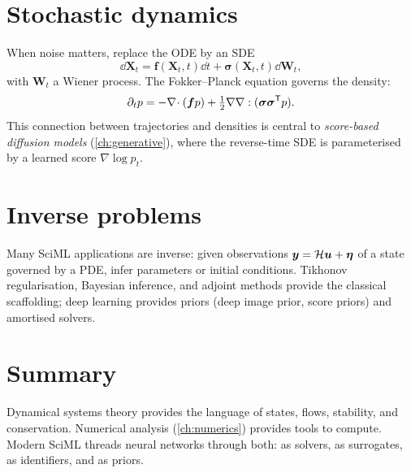\section{Stochastic dynamics}
When noise matters, replace the ODE by an SDE
\begin{equation}
\dd\bm{X}_t = \bm{f}(\bm{X}_t,t)\dd t + \bm{\sigma}(\bm{X}_t,t)\dd \bm{W}_t,
\end{equation}
with $\bm{W}_t$ a Wiener process. The Fokker--Planck equation governs
the density:
\begin{equation}
\partial_t p = -\nabla\!\cdot(\bm{f}p) + \tfrac{1}{2}\nabla\nabla:(\bm{\sigma}\bm{\sigma}^{\mathsf{T}} p).
\end{equation}
This connection between trajectories and densities is central to
\emph{score-based diffusion models} (\cref{ch:generative}), where the
reverse-time SDE is parameterised by a learned score
$\nabla\log p_t$.

\section{Inverse problems}
Many SciML applications are inverse: given observations
$\bm{y}=\mathcal{H}\bm{u}+\bm{\eta}$ of a state governed by a PDE, infer
parameters or initial conditions. Tikhonov regularisation, Bayesian
inference, and adjoint methods provide the classical scaffolding;
deep learning provides priors (deep image prior, score priors) and
amortised solvers.

\section{Summary}
Dynamical systems theory provides the language of states, flows,
stability, and conservation. Numerical analysis (\cref{ch:numerics})
provides tools to compute. Modern SciML threads neural networks
through both: as solvers, as surrogates, as identifiers, and as priors.
